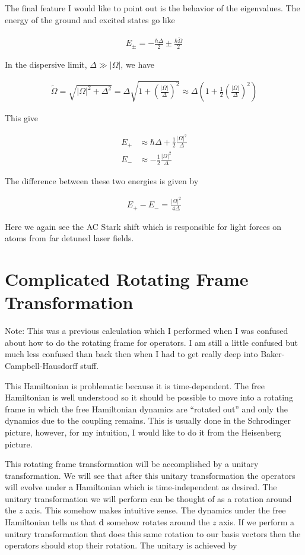 \documentclass[12pt]{article}
\newcommand{\bv}[1]{\boldsymbol{#1}}
\begin{document}
The final feature I would like to point out is the behavior of the eigenvalues. The energy of the ground and excited states go like

\begin{align}
E_{\pm} = -\frac{\hbar\Delta}{2} \pm \frac{\hbar\tilde{\Omega}}{2}
\end{align}

In the dispersive limit, $\Delta \gg |\Omega|$, we have

\begin{align}
\tilde{\Omega} = \sqrt{|\Omega|^2+\Delta^2} = \Delta \sqrt{1+\left(\frac{|\Omega|}{\Delta}\right)^2} \approx \Delta\left(1+\frac{1}{2}\left(\frac{|\Omega|}{\Delta}\right)^2\right)
\end{align}

This give

\begin{align}
E_+ &\approx \hbar \Delta + \frac{1}{2}\frac{|\Omega|^2}{\Delta}\\
E_- &\approx -\frac{1}{2}\frac{|\Omega|^2}{\Delta}
\end{align}

The difference between these two energies is given by

\begin{align}
E_+-E_- = \frac{|\Omega|^2}{4\Delta}
\end{align}

Here we again see the AC Stark shift which is responsible for light forces on atoms from far detuned laser fields.

\section{Complicated Rotating Frame Transformation}

Note: This was a previous calculation which I performed when I was confused about how to do the rotating frame for operators. I am still a little confused but much less confused than back then when I had to get really deep into Baker-Campbell-Hausdorff stuff.

This Hamiltonian is problematic because it is time-dependent. The free Hamiltonian is well understood so it should be possible to move into a rotating frame in which the free Hamiltonian dynamics are ``rotated out'' and only the dynamics due to the coupling remains. This is usually done in the Schrodinger picture, however, for my intuition, I would like to do it from the Heisenberg picture.

This rotating frame transformation will be accomplished by a unitary transformation. We will see that after this unitary transformation the operators will evolve under a Hamiltonian which is time-independent as desired. The unitary transformation we will perform can be thought of as a rotation around the $z$ axis. This somehow makes intuitive sense. The dynamics under the free Hamiltonian tells us that $\bv{d}$ somehow rotates around the $z$ axis. If we perform a unitary transformation that does this same rotation to our basis vectors then the operators should stop their rotation. The unitary is achieved by
\end{document}
